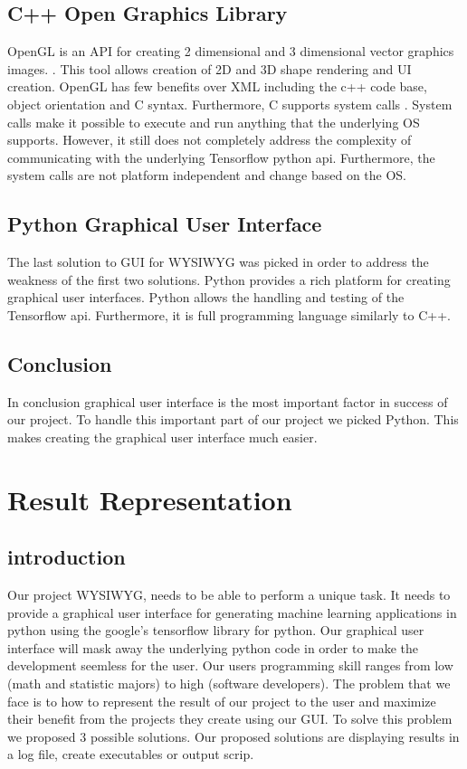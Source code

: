 \documentclass[journal,10pt,onecolumn,compsoc]{IEEEtran} \usepackage[margin=1.0in]{geometry} \usepackage{pdfpages} \usepackage{graphicx}
\begin{document}
\subsection{C++ Open Graphics Library}
OpenGL is an API for creating 2 dimensional and 3 dimensional vector graphics images. \cite{opengl}. 
This tool allows creation of 2D and 3D shape rendering and UI creation. 
OpenGL has few benefits over XML including the c++ code base, object orientation and C syntax. \cite{oop}
Furthermore, C supports system calls . 
System calls make it possible to execute and run anything that the underlying OS supports. 
However, it still does not completely address the complexity of communicating with the underlying Tensorflow python api. 
Furthermore, the system calls are not platform independent and change based on the OS.

\subsection{Python Graphical User Interface}
The last solution to GUI for WYSIWYG was picked in order to address the  weakness of the first two solutions. 
Python provides a rich platform for creating graphical user interfaces. 
Python allows the handling and testing of the Tensorflow api. 
Furthermore, it is full programming language similarly to C++.

\subsection{Conclusion}
In conclusion graphical user interface is the most important factor in success of our project. 
To handle this important part of our project we picked Python. This makes creating the graphical user interface much easier.

\newpage

\section{Result Representation}
\subsection{introduction}
Our project WYSIWYG, needs to be able to perform a unique task. 
It needs to provide a graphical user interface for generating machine learning applications in python using the google’s tensorflow library for python. 
Our graphical user interface will mask away the underlying python code in order to make the development seemless for the user. 
Our users programming skill ranges from low (math and statistic majors) to high (software developers). 
The problem that we face is to how to represent the result of our project to the user and maximize their benefit from the projects they create using our GUI. 
To solve this problem we proposed 3 possible solutions. Our proposed solutions are displaying results in a log file, create executables or output scrip.
\end{document}
